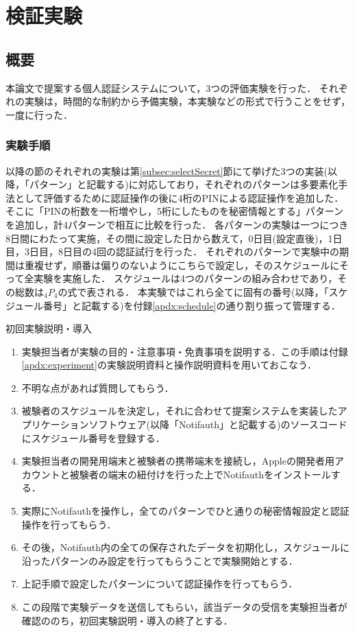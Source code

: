 \chapter{検証実験}\label{chap:experiment}

\section{概要}
本論文で提案する個人認証システムについて，3つの評価実験を行った．
それぞれの実験は，時間的な制約から予備実験，本実験などの形式で行うことをせず，一度に行った．

\subsection{実験手順}
以降の節のそれぞれの実験は第\ref{subsec:selectSecret}節にて挙げた3つの実装(以降，「パターン」と記載する)に対応しており，それぞれのパターンは多要素化手法として評価するために認証操作の後に4桁のPINによる認証操作を追加した．
そこに「PINの桁数を一桁増やし，5桁にしたものを秘密情報とする」パターンを追加し，計4パターンで相互に比較を行った．
各パターンの実験は一つにつき8日間にわたって実施，その間に設定した日から数えて，0日目(設定直後)，1日目，3日目，8日目の4回の認証試行を行った．
それぞれのパターンで実験中の期間は重複せず，順番は偏りのないようにこちらで設定し，そのスケジュールにそって全実験を実施した．
スケジュールは4つのパターンの組み合わせであり，その総数は$ {}_4 P _4 $の式で表される．
本実験ではこれら全てに固有の番号(以降，「スケジュール番号」と記載する)を付録\ref{apdx:schedule}の通り割り振って管理する．

初回実験説明・導入
\begin{enumerate}
  \item 実験担当者が実験の目的・注意事項・免責事項を説明する．この手順は付録\ref{apdx:experiment}の実験説明資料と操作説明資料を用いておこなう．
  \item 不明な点があれば質問してもらう．
  \item 被験者のスケジュールを決定し，それに合わせて提案システムを実装したアプリケーションソフトウェア(以降「Notifauth」と記載する)のソースコードにスケジュール番号を登録する．
  \item 実験担当者の開発用端末と被験者の携帯端末を接続し，Appleの開発者用アカウントと被験者の端末の紐付けを行った上でNotifauthをインストールする．
  \item 実際にNotifauthを操作し，全てのパターンでひと通りの秘密情報設定と認証操作を行ってもらう．
  \item その後，Notifauth内の全ての保存されたデータを初期化し，スケジュールに沿ったパターンのみ設定を行ってもらうことで実験開始とする．
  \item 上記手順で設定したパターンについて認証操作を行ってもらう．
  \item この段階で実験データを送信してもらい，該当データの受信を実験担当者が確認ののち，初回実験説明・導入の終了とする．
\end{enumerate}


